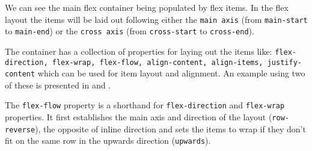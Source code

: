 
We can see the main flex container being populated by flex items. In the flex layout the items will be laid out following either the \texttt{main axis} (from \texttt{main-start} to \texttt{main-end}) or the \texttt{cross axis} (from \texttt{cross-start} to \texttt{cross-end}).

The container has a collection of properties for laying out the items like: \texttt{flex-direction, flex-wrap, flex-flow, align-content, align-items, justify-content} which can be used for item layout and alignment. An example using two of these is presented in  and .




The \texttt{flex-flow} property is a shorthand for \texttt{flex-direction} and \texttt{flex-wrap} properties. It first establishes the main axis and direction of the layout (\texttt{row-reverse}), the opposite of inline direction and sets the items to wrap if they don't fit on the same row in the upwards direction (\texttt{upwards}).